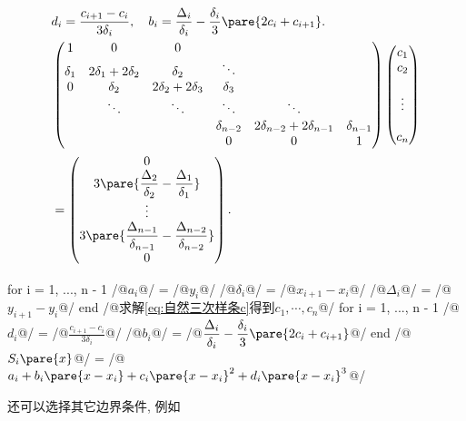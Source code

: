 \documentclass{ctexart}
\begin{document}
\begin{align}
    & d_i = \frac{c_{i+1} - c_i}{3\delta_i},\quad b_i = \frac{\Delta_i}{\delta_i} - \frac{\delta_i}{3}\pare{2c_i + c_{i+1}}. \notag \\
    & \begin{pmatrix}
        1 & 0 & 0 \\
        \delta_1 & 2\delta_1 + 2\delta_2 & \delta_2 & \ddots \\
        0 & \delta_2 & 2\delta_2+2\delta_3 & \delta_3 \\
        & \ddots & \ddots & \ddots & \ddots \\
        & & & \delta_{n-2} & 2\delta_{n-2}+2\delta_{n-1} & \delta_{n-1} \\
        & & & 0 & 0 & 1
    \end{pmatrix} \begin{pmatrix}
        c_1 \\ c_2 \\ \\ \vdots \\ \\ c_n
    \end{pmatrix} \notag \\ \label{eq:自然三次样条c} &= \begin{pmatrix}
        0 \\ \displaystyle 3\pare{\frac{\Delta_2}{\delta_2} - \frac{\Delta_1}{\delta_1}} \\ \vdots \\ \displaystyle 3\pare{\frac{\Delta_{n-1}}{\delta_{n-1}} - \frac{\Delta_{n-2}}{\delta_{n-2}}} \\ 0
    \end{pmatrix}.
\end{align}
\begin{matlablst}
for i = 1, ..., n - 1
    /@$a_i$@/ = /@$y_i$@/
    /@$\delta_i$@/ = /@$x_{i+1} - x_i$@/
    /@$\Delta_i$@/ = /@$y_{i+1} - y_i$@/
end
/@求解\eqref{eq:自然三次样条c}得到$c_1,\cdots,c_n$@/
for i = 1, ..., n - 1
    /@$d_i$@/ = /@$\displaystyle \frac{c_{i+1}-c_i}{3\delta_i}$@/
    /@$b_i$@/ = /@$\displaystyle \frac{\Delta_i}{\delta_i} - \displaystyle \frac{\delta_i}{3}\pare{2c_i+c_{i+1}}$@/
end
/@$S_i\pare{x}$@/ = /@$a_i + b_i\pare{x-x_i} + c_i\pare{x-x_i}^2 + d_i\pare{x-x_i}^3$@/
\end{matlablst}
还可以选择其它边界条件, 例如
\end{document}
